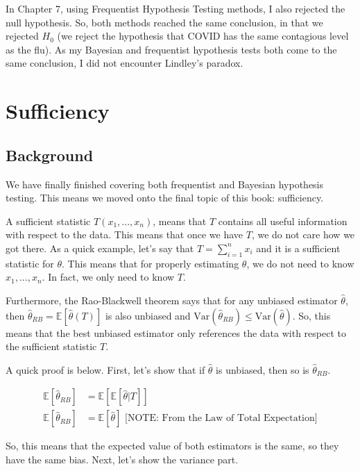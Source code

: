 \documentclass[
  letterpaper,
  DIV=11,
  numbers=noendperiod]{scrreprt}
\begin{document}
In Chapter 7, using Frequentist Hypothesis Testing methods, I also
rejected the null hypothesis. So, both methods reached the same
conclusion, in that we rejected \(H_0\) (we reject the hypothesis that
COVID has the same contagious level as the flu). As my Bayesian and
frequentist hypothesis tests both come to the same conclusion, I did not
encounter Lindley's paradox.


\chapter{Sufficiency}\label{sufficiency}

\section{Background}\label{background-9}

We have finally finished covering both frequentist and Bayesian
hypothesis testing. This means we moved onto the final topic of this
book: sufficiency.

A sufficient statistic \(T(x_1,...,x_n)\), means that \(T\) contains all
useful information with respect to the data. This means that once we
have \(T\), we do not care how we got there. As a quick example, let's
say that \(T = \sum_{i=1}^n x_i\) and it is a sufficient statistic for
\(\theta\). This means that for properly estimating \(\theta\), we do
not need to know \(x_1,...,x_n\). In fact, we only need to know \(T\).

Furthermore, the Rao-Blackwell theorem says that for any unbiased
estimator \(\hat{\theta}\), then
\(\hat{\theta}_{RB} = \mathbb{E}[\hat{\theta}(T)]\) is also unbiased and
\(\text{Var}(\hat{\theta}_{RB}) \leq \text{Var}(\hat{\theta})\). So,
this means that the best unbiased estimator only references the data
with respect to the sufficient statistic \(T\).

A quick proof is below. First, let's show that if \(\hat{\theta}\) is
unbiased, then so is \(\hat{\theta}_{RB}\).

\[
\begin{aligned}
  \mathbb{E}[\hat{\theta}_{RB}] &= \mathbb{E}[\mathbb{E}[\hat{\theta} | T]]  \\
  \mathbb{E}[\hat{\theta}_{RB}] &= \mathbb{E}[\hat{\theta}] \text{   [NOTE: From the Law of Total Expectation]}
\end{aligned}
\]

So, this means that the expected value of both estimators is the same,
so they have the same bias. Next, let's show the variance part.
\end{document}
